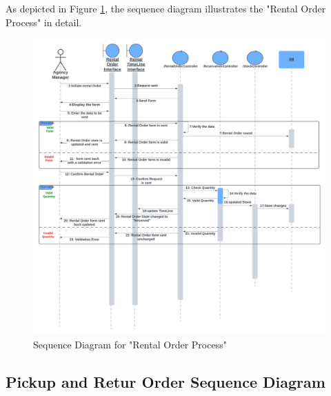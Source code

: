 As depicted in Figure \ref{fig:rental_order_sequence_diagram}, the sequence diagram illustrates the "Rental Order Process" in detail.

\begin{figure}[h]
    \centering
    \includegraphics[width=1\textwidth]{sprint2/Sprint2Sequence1.png}
    \caption{Sequence Diagram for "Rental Order Process"}
    \label{fig:rental_order_sequence_diagram}
\end{figure} 
\newpage
\subsection{Pickup and Retur Order Sequence Diagram}

